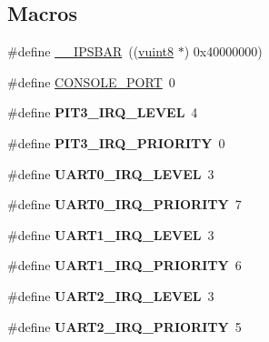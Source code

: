 \subsection*{Macros}
\begin{DoxyCompactItemize}
\item 
\#define \mbox{\hyperlink{group__RTEMSBSPsM68kMCF52235_gabdb86768904e30373b5aa4cf02a915b6}{\+\_\+\+\_\+\+I\+P\+S\+B\+AR}}~((\mbox{\hyperlink{group__RTEMSBSPsM68kMCF5329_gab2208c2cec6d83509a16c4b4e177bc20}{vuint8}} $\ast$) 0x40000000)
\item 
\#define \mbox{\hyperlink{group__RTEMSBSPsM68kMCF52235_ga0859abd84f64f7f09ad95a4079b06f41}{C\+O\+N\+S\+O\+L\+E\+\_\+\+P\+O\+RT}}~0
\item 
\mbox{\label{group__RTEMSBSPsM68kMCF52235_ga70573852241aab02cc64e2c8745cd24f}} 
\#define {\bfseries P\+I\+T3\+\_\+\+I\+R\+Q\+\_\+\+L\+E\+V\+EL}~4
\item 
\mbox{\label{group__RTEMSBSPsM68kMCF52235_ga5aa390a01c2fd3849f575eeec819ac4a}} 
\#define {\bfseries P\+I\+T3\+\_\+\+I\+R\+Q\+\_\+\+P\+R\+I\+O\+R\+I\+TY}~0
\item 
\mbox{\label{group__RTEMSBSPsM68kMCF52235_ga3f6403d98a553ab7e5246ace59655611}} 
\#define {\bfseries U\+A\+R\+T0\+\_\+\+I\+R\+Q\+\_\+\+L\+E\+V\+EL}~3
\item 
\mbox{\label{group__RTEMSBSPsM68kMCF52235_ga421617dbbfc69fbbe3e88835e4c26dc5}} 
\#define {\bfseries U\+A\+R\+T0\+\_\+\+I\+R\+Q\+\_\+\+P\+R\+I\+O\+R\+I\+TY}~7
\item 
\mbox{\label{group__RTEMSBSPsM68kMCF52235_ga8db7b2e20155ab9adf447660e92010b1}} 
\#define {\bfseries U\+A\+R\+T1\+\_\+\+I\+R\+Q\+\_\+\+L\+E\+V\+EL}~3
\item 
\mbox{\label{group__RTEMSBSPsM68kMCF52235_gafa24779091dd9f575af1f8482cea5b2a}} 
\#define {\bfseries U\+A\+R\+T1\+\_\+\+I\+R\+Q\+\_\+\+P\+R\+I\+O\+R\+I\+TY}~6
\item 
\mbox{\label{group__RTEMSBSPsM68kMCF52235_ga4fa66263959fe836ffc8cc89554a22e7}} 
\#define {\bfseries U\+A\+R\+T2\+\_\+\+I\+R\+Q\+\_\+\+L\+E\+V\+EL}~3
\item 
\mbox{\label{group__RTEMSBSPsM68kMCF52235_gabe7562294780b56d1dd0e8cc91df557e}} 
\#define {\bfseries U\+A\+R\+T2\+\_\+\+I\+R\+Q\+\_\+\+P\+R\+I\+O\+R\+I\+TY}~5
\end{DoxyCompactItemize}
